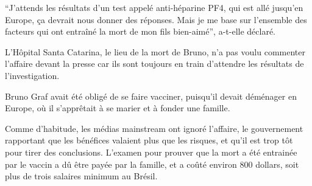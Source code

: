 “J'attends les résultats d'un test appelé anti-héparine PF4, qui est allé
jusqu'en Europe, ça devrait nous donner des réponses. Mais je me base sur
l'ensemble des facteurs qui ont entraîné la mort de mon fils bien-aimé”,
a-t-elle déclaré.

L'Hôpital Santa Catarina, le lieu de la mort de Bruno, n'a pas voulu commenter
l'affaire devant la presse car ils sont toujours en train d'attendre les
résultats de l'investigation.

Bruno Graf avait été obligé de se faire vacciner, puisqu'il devait déménager en
Europe, où il s'apprêtait à se marier et à fonder une famille.

Comme d'habitude, les médias mainstream ont ignoré l'affaire, le gouvernement
rapportant que les bénéfices valaient plus que les risques, et qu'il est trop
tôt pour tirer des conclusions. L'examen pour prouver que la mort a été
entrainée par le vaccin a dû être payée par la famille, et a coûté environ 800
dollars, soit plus de trois salaires minimum au Brésil.

